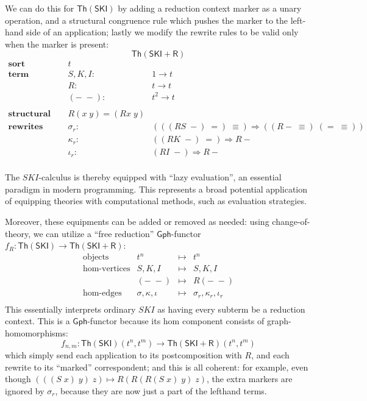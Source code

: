 \documentclass{amsart}
\theoremstyle{definition}
\newcommand{\Th}{\mathsf{Th}}
\newcommand{\Gph}{\mathsf{Gph}}
\newcommand{\maps}{\colon}
\begin{document}
We can do this for $\Th(\mathsf{SKI})$ by adding a reduction context marker as a unary operation, and a structural congruence rule which pushes the marker to the left-hand side of an application; lastly we modify the rewrite rules to be valid only when the marker is present:
$$\Th(\mathsf{SKI}+\mathsf{R})$$
\[\begin{array}{rcl}
\textbf{sort} & t &\\
\textbf{term constructors} & S,K,I \maps &1 \to t\\
& R\maps & t \to t\\
& (-\; -)\maps & t^2 \to t\\\\
\textbf{structural congruence} & R(x\; y) = (Rx\; y) &\\
\textbf{rewrites} & \sigma_r\maps & (((RS\; -)\; =)\; \equiv) \Rightarrow ((R-\; \equiv)\; (=\; \equiv))\\
& \kappa_r\maps & ((RK\; -)\; =) \Rightarrow R-\\
& \iota_r\maps & (RI\; -) \Rightarrow R-\\
\end{array}\]

The $SKI$-calculus is thereby equipped with ``lazy evaluation'', an essential paradigm in modern programming. This represents a broad potential application of equipping theories with computational methods, such as evaluation strategies.

Moreover, these equipments can be added or removed as needed: using change-of-theory, we can utilize a ``free reduction'' $\Gph$-functor $f_R\maps\Th(\mathsf{SKI})\to \Th(\mathsf{SKI}+\mathsf{R})$:
\[\begin{array}{rrcl}
\text{objects} & t^n & \mapsto & t^n\\
\text{hom-vertices} & S,K,I & \mapsto & S,K,I\\
& (-\; -) & \mapsto & R(-\; -)\\
\text{hom-edges} & \sigma, \kappa, \iota & \mapsto & \sigma_r, \kappa_r, \iota_r\\
\end{array}\]
This essentially interprets ordinary $SKI$ as having every subterm be a reduction context. This is a $\Gph$-functor because its hom component consists of graph-homomorphisms: $$f_{n,m}\maps \Th(\mathsf{SKI})(t^n,t^m) \to \Th(\mathsf{SKI}+\mathsf{R})(t^n,t^m)$$ which simply send each application to its postcomposition with $R$, and each rewrite to its ``marked'' correspondent; and this is all coherent: for example, even though $(((S\; x)\; y)\; z) \mapsto R(R(R(S\; x)\; y)\; z)$, the extra markers are ignored by $\sigma_r$, because they are now just a part of the lefthand terms.
\end{document}

